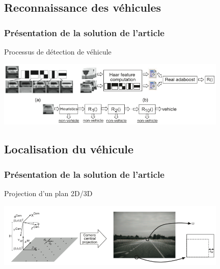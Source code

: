 \subsection{Reconnaissance des véhicules}
\begin{frame}
\frametitle{Présentation de la solution de l'article}

Processus de détection de véhicule
\begin{center}
  \includegraphics[width=11cm]{image/detectionVehicule.png}
\end{center}

\end{frame}

\subsection{Localisation du véhicule}
\begin{frame}
\frametitle{Présentation de la solution de l'article}

Projection d'un plan 2D/3D
\begin{center}
  \includegraphics[width=11cm]{image/position.png}
\end{center}

\end{frame}
